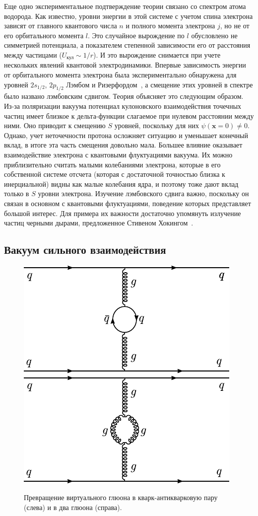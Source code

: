 \documentclass[a4paper, 12pt]{article}
\def\vec#1{\mathbf{#1}}
\begin{document}
Еще одно экспериментальное подтверждение теории связано со спектром атома водорода. 
Как известно, уровни энергии в этой системе с учетом спина электрона зависят от главного квантового числа $n$ и полного момента электрона $j$, но не от его орбитального момента $l$. 
Это случайное вырождение по $l$ обусловлено не симметрией потенциала, а показателем степенной зависимости его от расстояния между частицами ($U_\text{кул} \sim 1/r$).
И это вырождение снимается при учете нескольких явлений квантовой электродинамики. 
Впервые зависимость энергии от орбитального момента электрона была экспериментально обнаружена для уровней $2s_{1/2}$, $2p_{1/2}$ Лэмбом и Ризерфордом~\cite{LambShift.exp}, а смещение этих уровней в спектре было названо лэмбовским сдвигом. 
%
Теория объясняет это следующим образом.
Из-за поляризации вакуума потенциал кулоновского взаимодействия точечных частиц имеет близкое к дельта-функции слагаемое при нулевом расстоянии между ними. 
Оно приводит к смещению $S$ уровней, поскольку для них $\psi(\vec{x}=0)\neq0$. 
Однако, учет неточечности протона осложняет ситуацию и уменьшает конечный вклад, в итоге эта часть смещения довольно мала. 
Большее влияние оказывает взаимодействие электрона с квантовыми флуктуациями вакуума. 
Их можно приблизительно считать малыми колебаниями электрона, которые в его собственной системе отсчета (которая с достаточной точностью близка к инерциальной) видны как малые колебания ядра, и поэтому тоже дают вклад только в $S$ уровни электрона. 
Изучение лэмбовского сдвига важно, поскольку он связан в основном с квантовыми флуктуациями, поведение которых представляет большой интерес. 
Для примера их важности достаточно упомянуть излучение частиц черными дырами, предложенное Стивеном Хокингом~\cite{Hawking}.

\subsection{Вакуум сильного взаимодействия}

\begin{figure}[b]
\null
\hfill
\includegraphics[width=.45\linewidth]{figs/Gluon-qq}
\hfill
\hfill
\includegraphics[width=.45\linewidth]{figs/Gluon-gg}
\hfill
\null
\caption{Превращение виртуального глюона в кварк-антикварковую пару (слева) и в два глюона (справа).}
\label{fig:gluon-qq-gg}
\end{figure}
\end{document}
